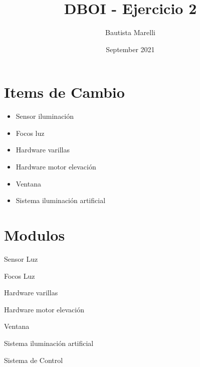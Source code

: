 \documentclass[12pt,a4paper,fleqn]{article}
\title{DBOI - Ejercicio 2}
\author{Bautista Marelli}
\date{September 2021}
\begin{document}
\maketitle

\section{Items de Cambio}
\begin{itemize}
    \item Sensor iluminación
    \item Focos luz
    \item Hardware varillas
    \item Hardware motor elevación
    \item Ventana
    \item Sistema iluminación artificial
\end{itemize}

\section{Modulos}

\begin{module}{Sensor Luz}
\eproc
{}
\end{module}

\begin{module}{Focos Luz}
\eproc
{}
\end{module}

\begin{module}{Hardware varillas}
\eproc
{}
\end{module}

\begin{module}{Hardware motor elevación}
\eproc
{}
\end{module}

\begin{module}{Ventana}
\eproc
{}
\end{module}

\begin{module}{Sistema iluminación artificial}
\eproc
{}
\end{module}

\begin{module}{Sistema de Control}
\eproc
{}
\end{module}
\end{document}
